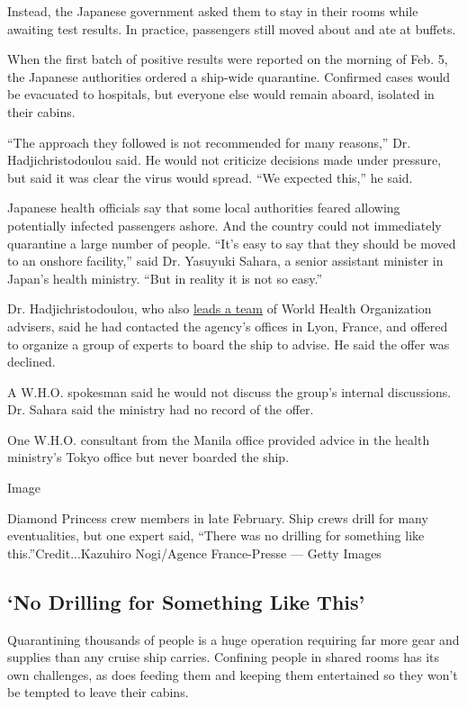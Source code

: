 Instead, the Japanese government asked them to stay in their rooms while
awaiting test results. In practice, passengers still moved about and ate
at buffets.

When the first batch of positive results were reported on the morning of
Feb. 5, the Japanese authorities ordered a ship-wide quarantine.
Confirmed cases would be evacuated to hospitals, but everyone else would
remain aboard, isolated in their cabins.

``The approach they followed is not recommended for many reasons,'' Dr.
Hadjichristodoulou said. He would not criticize decisions made under
pressure, but said it was clear the virus would spread. ``We expected
this,'' he said.

Japanese health officials say that some local authorities feared
allowing potentially infected passengers ashore. And the country could
not immediately quarantine a large number of people. ``It's easy to say
that they should be moved to an onshore facility,'' said Dr. Yasuyuki
Sahara, a senior assistant minister in Japan's health ministry. ``But in
reality it is not so easy.''

Dr. Hadjichristodoulou, who also
\href{http://apps.who.int/whocc/Detail.aspx?cc_ref=GRE-27\&cc_code=gre}{leads
a team} of World Health Organization advisers, said he had contacted the
agency's offices in Lyon, France, and offered to organize a group of
experts to board the ship to advise. He said the offer was declined.

A W.H.O. spokesman said he would not discuss the group's internal
discussions. Dr. Sahara said the ministry had no record of the offer.

One W.H.O. consultant from the Manila office provided advice in the
health ministry's Tokyo office but never boarded the ship.

Image

Diamond Princess crew members in late February. Ship crews drill for
many eventualities, but one expert said, ``There was no drilling for
something like this.''Credit...Kazuhiro Nogi/Agence France-Presse ---
Getty Images

\hypertarget{no-drilling-for-something-like-this}{%
\subsection{`No Drilling for Something Like
This'}\label{no-drilling-for-something-like-this}}

Quarantining thousands of people is a huge operation requiring far more
gear and supplies than any cruise ship carries. Confining people in
shared rooms has its own challenges, as does feeding them and keeping
them entertained so they won't be tempted to leave their cabins.

